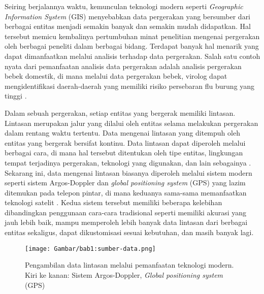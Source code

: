 

Seiring berjalannya waktu, kemunculan teknologi modern seperti \textit{Geographic Information System} (GIS) menyebabkan data pergerakan yang bersumber dari berbagai entitas menjadi semakin banyak dan semakin mudah didapatkan. Hal tersebut memicu kembalinya pertumbuhan minat penelitian mengenai pergerakan oleh berbagai peneliti dalam berbagai bidang. Terdapat banyak hal menarik yang dapat dimanfaatkan melalui analisis terhadap data pergerakan. Salah satu contoh nyata dari pemanfaatan analisis data pergerakan adalah analisis pergerakan bebek domestik, di mana melalui data pergerakan bebek, virolog dapat mengidentifikasi daerah-daerah yang memiliki risiko persebaran flu burung yang tinggi \cite{diann:01:movement-analysis}.

Dalam sebuah pergerakan, setiap entitas yang bergerak memiliki lintasan. Lintasan merupakan jalur yang dilalui oleh entitas selama melakukan pergerakan dalam rentang waktu tertentu. Data mengenai lintasan yang ditempuh oleh entitas yang bergerak bersifat kontinu. Data lintasan dapat diperoleh melalui berbagai cara, di mana hal tersebut ditentukan oleh tipe entitas, lingkungan tempat terjadinya pergerakan, teknologi yang digunakan, dan lain sebagainya \cite{wiratma:trajectory}. Sekarang ini, data mengenai lintasan biasanya diperoleh melalui sistem modern seperti sistem Argos-Doppler dan \textit{global positioning system} (GPS) yang lazim ditemukan pada telepon pintar, di mana keduanya sama-sama memanfaatkan teknologi satelit \cite{carter:argos}. Kedua sistem tersebut memiliki beberapa kelebihan dibandingkan penggunaan cara-cara tradisional seperti memiliki akurasi yang jauh lebih baik, mampu memperoleh lebih banyak data lintasan dari berbagai entitas sekaligus, dapat dikustomisasi sesuai kebutuhan, dan masih banyak lagi.

\begin{figure}[h]
    \centering
    \texttt{[image: Gambar/bab1:sumber-data.png]}
    \caption[Teknologi pengambilan data lintasan]{Pengambilan data lintasan melalui pemanfaatan teknologi modern. Kiri ke kanan: Sistem Argos-Doppler, \textit{Global positioning system} (GPS)}
    \label{bab1:sumber-data}
\end{figure}

